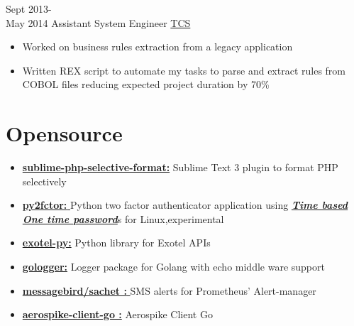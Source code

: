 \documentclass[letterpaper]{twentysecondcv} %
\begin{document}
\begin{twenty}
	\twentyitem
    	{Sept 2013-\\ May 2014}
        {Assistant System Engineer}
        {\href{https://www.tcs.com/}{TCS}}
        {}
        {
        \begin{itemize}
        	\item Worked on business rules extraction from a legacy application
            \item Written REX script to automate my tasks to parse and extract rules from COBOL files reducing expected project duration by 70\% 
        \end{itemize}
        }
\end{twenty}



\section{Opensource}
\begin{twenty}
        {
        {\begin{itemize}
        \item \href{https://github.com/sarathsp06/sublime-php-selective-format}{\textbf{sublime-php-selective-format:}} Sublime Text 3 plugin to format PHP selectively
        \item \href{https://github.com/sarathsp06/py2factor}{\textbf{py2fctor: }}Python two factor authenticator application using \href{https://tools.ietf.org/html/rfc6238}{\textbf{\textit{Time based One time password}}}s for Linux,experimental
        \item \href{https://github.com/sarathsp06/exotel-py}{\textbf{exotel-py:}} Python library for Exotel APIs
        \item \href{https://github.com/sarathsp06/gologger}{\textbf{gologger:}} Logger package for Golang with echo middle ware support
        \end{itemize} 
        }
        }
        {
        {\begin{itemize}
        \item \href{https://github.com/messagebird/sachet}{\textbf{ messagebird/sachet : }} SMS alerts for Prometheus' Alert-manager
        \item \href{https://github.com/aerospike/aerospike-client-go}{\textbf{aerospike-client-go :}} 
Aerospike Client Go
        \end{itemize} 
        }
        }

\end{twenty}
\end{document}

